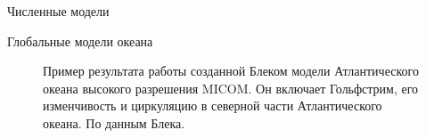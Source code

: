 \begin{chapter}{Численные модели}
\begin{section}{Глобальные модели океана}
\begin{figure}[t!]
\begin{centering}
\end{centering}
\caption{Пример результата работы созданной Блеком модели Атлантического
океана высокого разрешения MICOM. Он включает 
Гольфстрим, 
его изменчивость и циркуляцию в северной части Атлантического океана.
По данным Блека.}
\label{fig:blecksgulfstream}
\end{figure}
%


\end{section}
\end{chapter}

